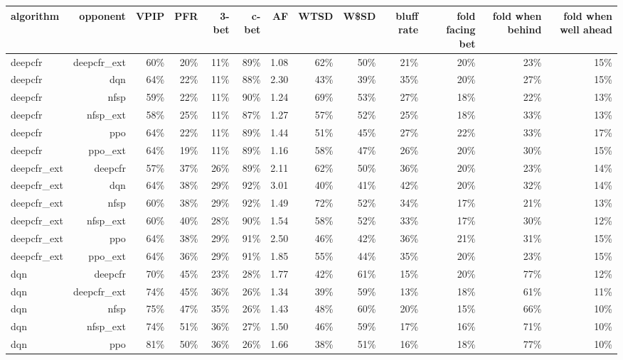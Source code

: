 \begin{tabular}{lrrrrrrrrrrrr}
\toprule
algorithm & opponent & VPIP & PFR & 3-bet & c-bet & AF & WTSD & W\$SD & bluff rate & fold facing bet & fold when behind & fold when well ahead \\
\midrule
deepcfr & deepcfr\_ext & 60\% & 20\% & 11\% & 89\% & 1.08 & 62\% & 50\% & 21\% & 20\% & 23\% & 15\% \\
deepcfr & dqn & 64\% & 22\% & 11\% & 88\% & 2.30 & 43\% & 39\% & 35\% & 20\% & 27\% & 15\% \\
deepcfr & nfsp & 59\% & 22\% & 11\% & 90\% & 1.24 & 69\% & 53\% & 27\% & 18\% & 22\% & 13\% \\
deepcfr & nfsp\_ext & 58\% & 25\% & 11\% & 87\% & 1.27 & 57\% & 52\% & 25\% & 18\% & 33\% & 13\% \\
deepcfr & ppo & 64\% & 22\% & 11\% & 89\% & 1.44 & 51\% & 45\% & 27\% & 22\% & 33\% & 17\% \\
deepcfr & ppo\_ext & 64\% & 19\% & 11\% & 89\% & 1.16 & 58\% & 47\% & 26\% & 20\% & 30\% & 15\% \\
deepcfr\_ext & deepcfr & 57\% & 37\% & 26\% & 89\% & 2.11 & 62\% & 50\% & 36\% & 20\% & 23\% & 14\% \\
deepcfr\_ext & dqn & 64\% & 38\% & 29\% & 92\% & 3.01 & 40\% & 41\% & 42\% & 20\% & 32\% & 14\% \\
deepcfr\_ext & nfsp & 60\% & 38\% & 29\% & 92\% & 1.49 & 72\% & 52\% & 34\% & 17\% & 21\% & 13\% \\
deepcfr\_ext & nfsp\_ext & 60\% & 40\% & 28\% & 90\% & 1.54 & 58\% & 52\% & 33\% & 17\% & 30\% & 12\% \\
deepcfr\_ext & ppo & 64\% & 38\% & 29\% & 91\% & 2.50 & 46\% & 42\% & 36\% & 21\% & 31\% & 15\% \\
deepcfr\_ext & ppo\_ext & 64\% & 36\% & 29\% & 91\% & 1.85 & 55\% & 44\% & 35\% & 20\% & 23\% & 15\% \\
dqn & deepcfr & 70\% & 45\% & 23\% & 28\% & 1.77 & 42\% & 61\% & 15\% & 20\% & 77\% & 12\% \\
dqn & deepcfr\_ext & 74\% & 45\% & 36\% & 26\% & 1.34 & 39\% & 59\% & 13\% & 18\% & 61\% & 11\% \\
dqn & nfsp & 75\% & 47\% & 35\% & 26\% & 1.43 & 48\% & 60\% & 20\% & 15\% & 66\% & 10\% \\
dqn & nfsp\_ext & 74\% & 51\% & 36\% & 27\% & 1.50 & 46\% & 59\% & 17\% & 16\% & 71\% & 10\% \\
dqn & ppo & 81\% & 50\% & 36\% & 26\% & 1.66 & 38\% & 51\% & 16\% & 18\% & 77\% & 10\% \\

\end{tabular}
